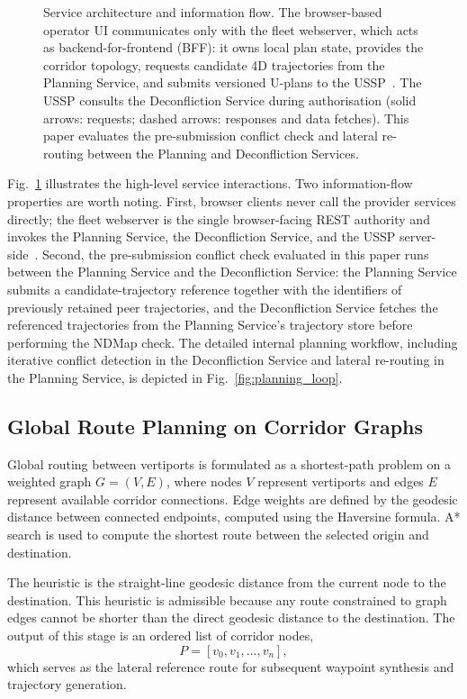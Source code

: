 \begin{figure}[!htbp]
\begin{tikzpicture}
  \end{tikzpicture}
  \caption{Service architecture and information flow. The browser-based operator UI communicates only with the fleet webserver, which acts as backend-for-frontend (BFF): it owns local plan state, provides the corridor topology, requests candidate 4D trajectories from the Planning Service, and submits versioned U-plans to the USSP~\cite{nagel2026microservice}. The USSP consults the Deconfliction Service during authorisation (solid arrows: requests; dashed arrows: responses and data fetches). This paper evaluates the pre-submission conflict check and lateral re-routing between the Planning and Deconfliction Services.}
  \label{fig:architecture}
\end{figure}

Fig.~\ref{fig:architecture} illustrates the high-level service interactions. Two information-flow properties are worth noting. First, browser clients never call the provider services directly; the fleet webserver is the single browser-facing REST authority and invokes the Planning Service, the Deconfliction Service, and the USSP server-side~\cite{nagel2026microservice}. Second, the pre-submission conflict check evaluated in this paper runs between the Planning Service and the Deconfliction Service: the Planning Service submits a candidate-trajectory reference together with the identifiers of previously retained peer trajectories, and the Deconfliction Service fetches the referenced trajectories from the Planning Service's trajectory store before performing the NDMap check. The detailed internal planning workflow, including iterative conflict detection in the Deconfliction Service and lateral re-routing in the Planning Service, is depicted in Fig.~\ref{fig:planning_loop}.

\subsection{Global Route Planning on Corridor Graphs}
\label{sec:global_planning}

Global routing between vertiports is formulated as a shortest-path problem on a weighted graph \(G=(V,E)\), where nodes \(V\) represent vertiports and edges \(E\) represent available corridor connections. Edge weights are defined by the geodesic distance between connected endpoints, computed using the Haversine formula. A* search is used to compute the shortest route between the selected origin and destination.

The heuristic is the straight-line geodesic distance from the current node to the destination. This heuristic is admissible because any route constrained to graph edges cannot be shorter than the direct geodesic distance to the destination. The output of this stage is an ordered list of corridor nodes,
\[
P = [v_0, v_1, \dots, v_n],
\]
which serves as the lateral reference route for subsequent waypoint synthesis and trajectory generation.

